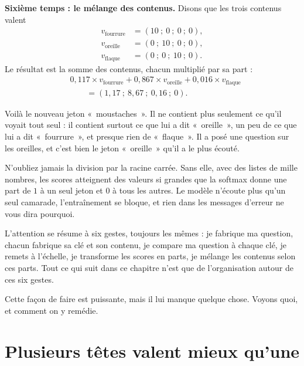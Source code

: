 \begin{exemple}
\textbf{Sixième temps : le mélange des contenus.} Disons que les trois
contenus valent
\[
  \begin{aligned}
    v_{\text{fourrure}} &= (10 \ ; \ 0 \ ; \ 0 \ ; \ 0), \\
    v_{\text{oreille}}  &= (0 \ ; \ 10 \ ; \ 0 \ ; \ 0), \\
    v_{\text{flaque}}   &= (0 \ ; \ 0 \ ; \ 10 \ ; \ 0).
  \end{aligned}
\]
Le résultat est la somme des contenus, chacun multiplié par sa part :
\[
  \begin{aligned}
    &0{,}117 \times v_{\text{fourrure}}
     + 0{,}867 \times v_{\text{oreille}}
     + 0{,}016 \times v_{\text{flaque}} \\
    &\qquad = (1{,}17 \ ; \ 8{,}67 \ ; \ 0{,}16 \ ; \ 0).
  \end{aligned}
\]

Voilà le nouveau jeton «~moustaches~». Il ne contient plus seulement ce
qu'il voyait tout seul : il contient surtout ce que lui a dit «~oreille~»,
un peu de ce que lui a dit «~fourrure~», et presque rien de «~flaque~». Il a
posé une question sur les oreilles, et c'est bien le jeton «~oreille~» qu'il
a le plus écouté.
\end{exemple}

\begin{piege}
N'oubliez jamais la division par la racine carrée. Sans elle, avec des
listes de mille nombres, les scores atteignent des valeurs si grandes que la
softmax donne une part de $1$ à un seul jeton et $0$ à tous les autres. Le
modèle n'écoute plus qu'un seul camarade, l'entraînement se bloque, et rien
dans les messages d'erreur ne vous dira pourquoi.
\end{piege}

\begin{aretenir}
L'attention se résume à six gestes, toujours les mêmes : je fabrique ma
question, chacun fabrique sa clé et son contenu, je compare ma question à
chaque clé, je remets à l'échelle, je transforme les scores en parts, je
mélange les contenus selon ces parts. Tout ce qui suit dans ce chapitre
n'est que de l'organisation autour de ces six gestes.
\end{aretenir}

Cette façon de faire est puissante, mais il lui manque quelque chose. Voyons
quoi, et comment on y remédie.

\section{Plusieurs têtes valent mieux qu'une}


